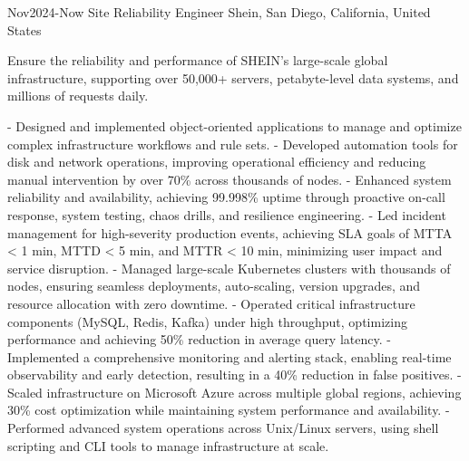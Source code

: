 \documentclass[9pt]{developercv} %
\begin{document}
\begin{entrylist}
	\entry
		{Nov2024-Now}
		{Site Reliability Engineer}
		{Shein, San Diego, California, United States}
		{
            Ensure the reliability and performance of SHEIN’s large-scale global infrastructure, supporting over 50,000+ servers, petabyte-level data systems, and millions of requests daily.\newline

			- Designed and implemented object-oriented applications to manage and optimize complex infrastructure workflows and rule sets.\newline
            - Developed automation tools for disk and network operations, improving operational efficiency and reducing manual intervention by over 70\% across thousands of nodes.\newline
            - Enhanced system reliability and availability, achieving 99.998\% uptime through proactive on-call response, system testing, chaos drills, and resilience engineering.\newline
            - Led incident management for high-severity production events, achieving SLA goals of MTTA < 1 min, MTTD < 5 min, and MTTR < 10 min, minimizing user impact and service disruption.\newline
            - Managed large-scale Kubernetes clusters with thousands of nodes, ensuring seamless deployments, auto-scaling, version upgrades, and resource allocation with zero downtime.\newline
			- Operated critical infrastructure components (MySQL, Redis, Kafka) under high throughput, optimizing performance and achieving 50\% reduction in average query latency.\newline
			- Implemented a comprehensive monitoring and alerting stack, enabling real-time observability and early detection, resulting in a 40\% reduction in false positives.\newline
			- Scaled infrastructure on Microsoft Azure across multiple global regions, achieving 30\% cost optimization while maintaining system performance and availability.\newline
			- Performed advanced system operations across Unix/Linux servers, using shell scripting and CLI tools to manage infrastructure at scale.\newline\newline

}
\end{entrylist}
\end{document}
